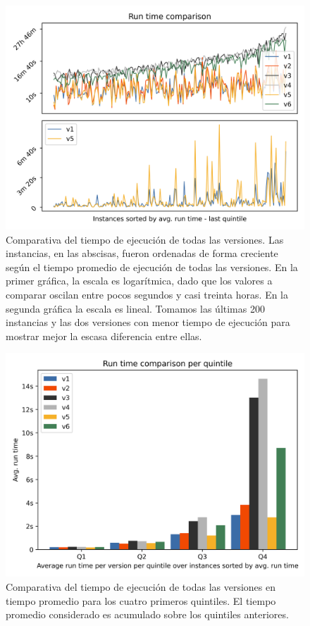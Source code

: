 \documentclass{article}
\begin{document}
  \begin{figure}[h!]
    \centering
    \includegraphics[width=12cm]{../resources/run_time_comparsion.png}
    \caption{Comparativa del tiempo de ejecución de todas las versiones. Las instancias, en las abscisas, fueron ordenadas de forma creciente según el tiempo promedio de ejecución de todas las versiones. En la primer gráfica, la escala es logarítmica, dado que los valores a comparar oscilan entre pocos segundos y casi treinta horas. En la segunda gráfica la escala es lineal. Tomamos las últimas 200 instancias y las dos versiones con menor tiempo de ejecución para mostrar mejor la escasa diferencia entre ellas.}
    \label{fig:runtimecomparison}
  \end{figure}

  \begin{figure}[h!]
    \centering
    \includegraphics[width=12cm]{../resources/run_time_comparsion_by_quintile.png}
      \caption{Comparativa del tiempo de ejecución de todas las versiones en tiempo promedio para los cuatro primeros quintiles. El tiempo promedio considerado es acumulado sobre los quintiles anteriores.}
    \label{fig:firstfourquintiles}
  \end{figure}
\end{document}
